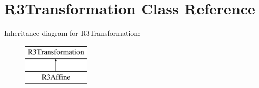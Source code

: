 \hypertarget{class_r3_transformation}{}\section{R3\+Transformation Class Reference}
\label{class_r3_transformation}
Inheritance diagram for R3\+Transformation\+:\begin{figure}[H]
\begin{center}
\leavevmode
\includegraphics[height=2.000000cm]{class_r3_transformation}
\end{center}
\end{figure}
